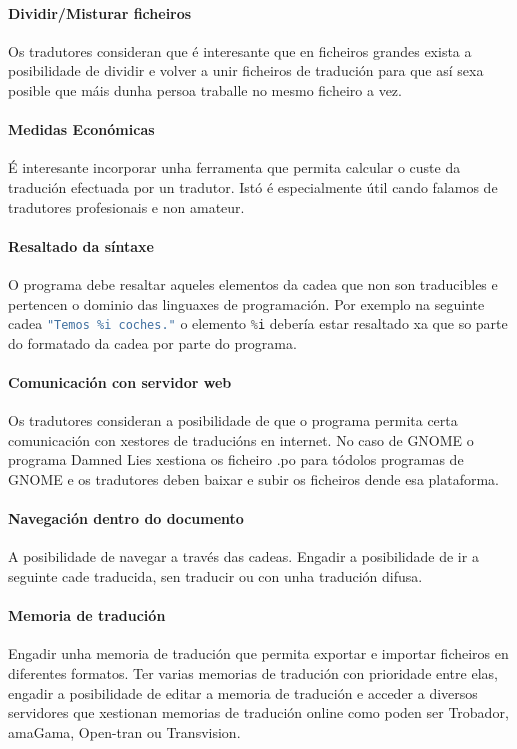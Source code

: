 	\paragraph{Dividir/Misturar ficheiros} Os tradutores consideran que é interesante que en ficheiros grandes exista a posibilidade de dividir e volver a unir ficheiros de tradución para que así sexa posible que máis dunha persoa traballe no mesmo ficheiro a vez.

	\paragraph{Medidas Económicas} É interesante incorporar unha ferramenta que permita calcular o custe da tradución efectuada por un tradutor. Istó é especialmente útil cando falamos de tradutores profesionais e non amateur.

	\paragraph{Resaltado da síntaxe} O programa debe resaltar aqueles elementos da cadea que non son traducibles e pertencen o dominio das linguaxes de programación. Por exemplo na seguinte cadea \lstinline[language=C]{"Temos %i coches."} o elemento \lstinline[language=C]{%i} debería estar resaltado xa que so parte do formatado da cadea por parte do programa.

	\paragraph{Comunicación con servidor web} Os tradutores consideran a posibilidade de que o programa permita certa comunicación con xestores de traducións en internet. No caso de GNOME o programa Damned Lies xestiona os ficheiro .po para tódolos programas de GNOME e os tradutores deben baixar e subir os ficheiros dende esa plataforma.

	\paragraph{Navegación dentro do documento} A posibilidade de navegar a través das cadeas. Engadir a posibilidade de ir a seguinte cade traducida, sen traducir ou con unha tradución difusa.

	\paragraph{Memoria de tradución} Engadir unha memoria de tradución que permita exportar e importar ficheiros en diferentes formatos. Ter varias memorias  de tradución con prioridade entre elas, engadir a posibilidade de editar a memoria de tradución e acceder a diversos servidores que xestionan memorias de tradución online como poden ser Trobador, amaGama, Open-tran ou Transvision.

